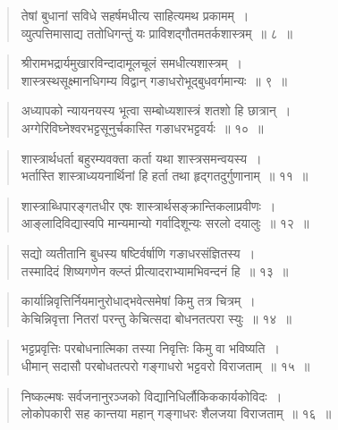 {\begin{verse}
तेषां बुधानां सविधे सहर्षमधीत्य साहित्यमथ प्रकामम्~।\\
व्युत्पत्तिमासाद्य ततोधिगन्तुं यः प्राविशद्गौतमतर्कशास्त्रम्~॥ ८~॥
\end{verse}

\begin{verse}
श्रीरामभद्रार्यमुखारविन्दादामूलचूलं समधीत्यशास्त्रम्~।\\
शास्त्रस्थसूक्ष्मानधिगम्य विद्वान् गङाधरोभूद्बुधवर्गमान्यः~॥ ९~॥
\end{verse}

\begin{verse}
अध्यापको न्यायनयस्य भूत्वा सम्बोध्यशास्त्रं शतशो हि छात्रान्~।\\
अग्गेरिविघ्नेश्वरभट्टसूनुर्चकास्ति गङाधरभट्टवर्यः~॥ १०~॥
\end{verse}

\begin{verse}
शास्त्रार्थधर्ता बहुरम्यवक्ता कर्ता यथा शास्त्रसमन्वयस्य~।\\
भर्तास्ति शास्त्राध्ययनार्थिनां हि हर्ता तथा हृद्गतदुर्गुणानाम्~॥ ११~॥
\end{verse}

\begin{verse}
शास्त्राब्धिपारङ्गतधीर एषः शास्त्रार्थसङ्क्रान्तिकलाप्रवीणः~।\\
आङ्लादिविद्यास्वपि मान्यमान्यो गर्वादिशून्यः सरलो दयालुः~॥ १२~॥
\end{verse}

\begin{verse}
सद्यो व्यतीतानि बुधस्य षष्टिर्वर्षाणि गङाधरसंज्ञितस्य~।\\
तस्मादिदं शिष्यगणेन क्ल्प्तं प्रीत्यादराभ्यामभिवन्दनं हि~॥ १३~॥
\end{verse}

\begin{verse}
कार्यान्निवृत्तिर्नियमानुरोधाद्भवेत्समेषां किमु तत्र चित्रम्~।\\
केचिन्निवृत्ता नितरां परन्तु केचित्सदा बोधनतत्परा स्युः~॥ १४~॥
\end{verse}

\begin{verse}
भट्टप्रवृत्तिः परबोधनात्मिका तस्या निवृत्तिः किमु वा भविष्यति~।\\
धीमान् सदासौ परबोधतत्परो गङ्गाधरो भट्टवरो विराजताम्~॥ १५~॥
\end{verse}

\begin{verse}
निष्कल्मषः सर्वजनानुरञ्जको विद्यानिधिर्लौकिककार्यकोविदः~।\\
लोकोपकारी सह कान्तया महान् गङ्गाधरः शैलजया विराजताम्~॥ १६~॥
\end{verse}

}
